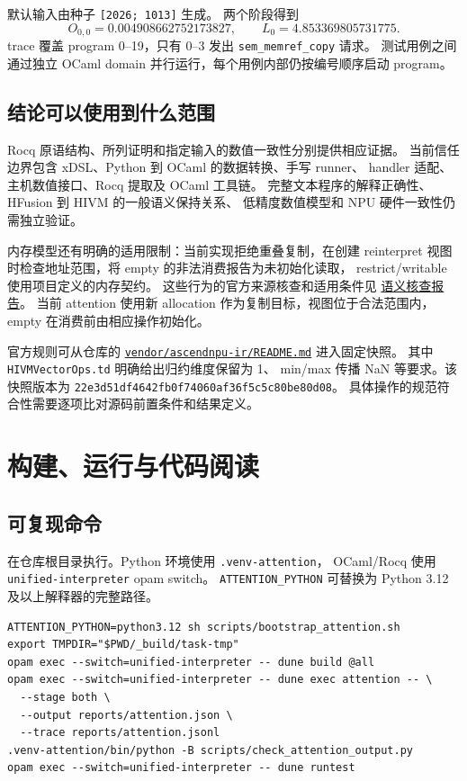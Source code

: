 \documentclass[UTF8,a4paper,11pt,fontset=fandol]{ctexart}
\newcommand{\code}{\nolinkurl}
\newcommand{\src}[1]{\href{run:../#1}{\nolinkurl{#1}}}
\begin{document}
{{{{{{{{默认输入由种子 \code{[2026; 1013]} 生成。
两个阶段得到
\[
 O_{0,0}=0.004908662752173827,\qquad
 L_0=4.853369805731775.
\]
trace 覆盖 program 0--19，只有 0--3 发出 \code{sem_memref_copy} 请求。
测试用例之间通过独立 OCaml domain 并行运行，每个用例内部仍按编号顺序启动 program。

\subsection{结论可以使用到什么范围}

Rocq 原语结构、所列证明和指定输入的数值一致性分别提供相应证据。
当前信任边界包含 xDSL、Python 到 OCaml 的数据转换、手写 runner、
handler 适配、主机数值接口、Rocq 提取及 OCaml 工具链。
完整文本程序的解释正确性、HFusion 到 HIVM 的一般语义保持关系、
低精度数值模型和 NPU 硬件一致性仍需独立验证。

内存模型还有明确的适用限制：当前实现拒绝重叠复制，在创建 reinterpret
视图时检查地址范围，将 empty 的非法消费报告为未初始化读取，
restrict/writable 使用项目定义的内存契约。
这些行为的官方来源核查和适用条件见
\href{semantics-audit-report.md}{语义核查报告}。
当前 attention 使用新 allocation 作为复制目标，视图位于合法范围内，
empty 在消费前由相应操作初始化。

官方规则可从仓库的 \src{vendor/ascendnpu-ir/README.md} 进入固定快照。
其中 \code{HIVMVectorOps.td} 明确给出归约维度保留为 1、
min/max 传播 NaN 等要求。该快照版本为
\nolinkurl{22e3d51df4642fb0f74060af36f5c5c80be80d08}。
具体操作的规范符合性需要逐项比对源码前置条件和结果定义。

\section{构建、运行与代码阅读}

\subsection{可复现命令}

在仓库根目录执行。Python 环境使用 \code{.venv-attention}，
OCaml/Rocq 使用 \code{unified-interpreter} opam switch。
\code{ATTENTION_PYTHON} 可替换为 Python 3.12 及以上解释器的完整路径。

\begin{lstlisting}
ATTENTION_PYTHON=python3.12 sh scripts/bootstrap_attention.sh
export TMPDIR="$PWD/_build/task-tmp"
opam exec --switch=unified-interpreter -- dune build @all
opam exec --switch=unified-interpreter -- dune exec attention -- \
  --stage both \
  --output reports/attention.json \
  --trace reports/attention.jsonl
.venv-attention/bin/python -B scripts/check_attention_output.py
opam exec --switch=unified-interpreter -- dune runtest
\end{lstlisting}

}}}}}}}}
\end{document}
